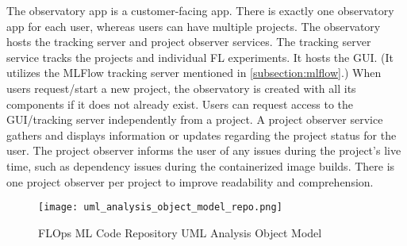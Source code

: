 The observatory app is a customer-facing app.
There is exactly one observatory app for each user, whereas users can have multiple projects.
The observatory hosts the tracking server and project observer services.
The tracking server service tracks the projects and individual FL experiments.
It hosts the GUI. 
(It utilizes the MLFlow tracking server mentioned in \ref{subsection:mlflow}.)
When users request/start a new project, the observatory is created with all its components if it does not already exist.
Users can request access to the GUI/tracking server independently from a project.
A project observer service gathers and displays information or updates regarding the project status for the user.
The project observer informs the user of any issues during the project's live time, such as dependency issues during the containerized image builds.
There is one project observer per project to improve readability and comprehension.

\begin{figure}[t]
    \centering
    \texttt{[image: uml\_analysis\_object\_model\_repo.png]}
    \caption{FLOps ML Code Repository UML Analysis Object Model}
    \label{fig:uml_repo_analysis_object_model}
\end{figure}

